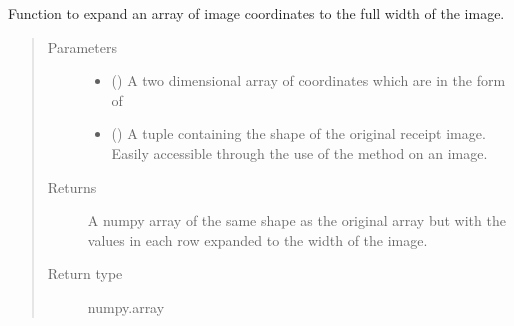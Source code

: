 \documentclass[letterpaper,10pt,english]{sphinxmanual}
\begin{document}
\begin{fulllineitems}
\label{\detokenize{api:readpyne.core.expand}}
Function to expand an array of image coordinates to the full width of
the image.
\begin{quote}\begin{description}
\item[{Parameters}] \leavevmode\begin{itemize}
\item {} 
 () \textendash{} A two dimensional array of coordinates which are in the form of

\item {} 
 () \textendash{} A tuple containing the shape of the original receipt image.
Easily accessible through the use of the  method on an
image.

\end{itemize}

\item[{Returns}] \leavevmode
A numpy array of the same shape as the original array but with
the  values in each row expanded to the width of the image.

\item[{Return type}] \leavevmode
numpy.array

\end{description}\end{quote}

\end{fulllineitems}

\end{document}
